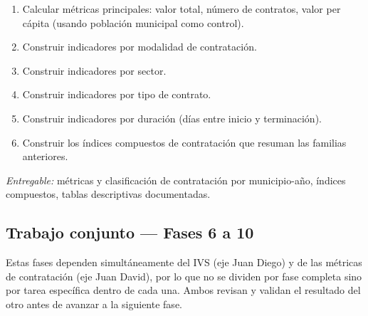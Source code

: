 \documentclass[11pt,letterpaper]{article}
\newenvironment{recuadro}[1]{%
  \begin{tcolorbox}[breakable,colback=boxbg,colframe=ustablue,boxrule=0.6pt,arc=1.5pt,
  title={\small\bfseries #1},fonttitle=\small,coltitle=white,colbacktitle=ustablue,
  left=6pt,right=6pt,top=4pt,bottom=4pt]
}{\end{tcolorbox}}
\begin{document}
\begin{recuadro}{Fase 5 completa --- Índices e indicadores de contratación pública}
\begin{enumerate}
\item Calcular métricas principales: valor total, número de contratos, valor
per cápita (usando población municipal como control).
\item Construir indicadores por modalidad de contratación.
\item Construir indicadores por sector.
\item Construir indicadores por tipo de contrato.
\item Construir indicadores por duración (días entre inicio y terminación).
\item Construir los índices compuestos de contratación que resuman las
familias anteriores.
\end{enumerate}
\textit{Entregable:} métricas y clasificación de contratación por
municipio-año, índices compuestos, tablas descriptivas documentadas.
\end{recuadro}

\subsection{Trabajo conjunto --- Fases 6 a 10}

Estas fases dependen simultáneamente del IVS (eje Juan Diego) y de las
métricas de contratación (eje Juan David), por lo que no se dividen por fase
completa sino por tarea específica dentro de cada una. Ambos revisan y validan
el resultado del otro antes de avanzar a la siguiente fase.
\end{document}
